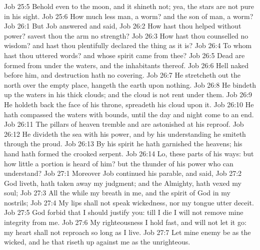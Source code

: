 \vs Job 25:5 Behold even to the moon, and it shineth not; yea, the stars are not pure in his sight.
\vs Job 25:6 How much less man,  a worm? and the son of man,  a worm?
\vs Job 26:1 But Job answered and said,
\vs Job 26:2 How hast thou helped  without power?  savest thou the arm  no strength?
\vs Job 26:3 How hast thou counselled  no wisdom? and  hast thou plentifully declared the thing as it is?
\vs Job 26:4 To whom hast thou uttered words? and whose spirit came from thee?
\vs Job 26:5 Dead  are formed from under the waters, and the inhabitants thereof.
\vs Job 26:6 Hell  naked before him, and destruction hath no covering.
\vs Job 26:7 He stretcheth out the north over the empty place,  hangeth the earth upon nothing.
\vs Job 26:8 He bindeth up the waters in his thick clouds; and the cloud is not rent under them.
\vs Job 26:9 He holdeth back the face of his throne,  spreadeth his cloud upon it.
\vs Job 26:10 He hath compassed the waters with bounds, until the day and night come to an end.
\vs Job 26:11 The pillars of heaven tremble and are astonished at his reproof.
\vs Job 26:12 He divideth the sea with his power, and by his understanding he smiteth through the proud.
\vs Job 26:13 By his spirit he hath garnished the heavens; his hand hath formed the crooked serpent.
\vs Job 26:14 Lo, these  parts of his ways: but how little a portion is heard of him? but the thunder of his power who can understand?
\vs Job 27:1 Moreover Job continued his parable, and said,
\vs Job 27:2  God liveth,  hath taken away my judgment; and the Almighty,  hath vexed my soul;
\vs Job 27:3 All the while my breath  in me, and the spirit of God  in my nostrils;
\vs Job 27:4 My lips shall not speak wickedness, nor my tongue utter deceit.
\vs Job 27:5 God forbid that I should justify you: till I die I will not remove mine integrity from me.
\vs Job 27:6 My righteousness I hold fast, and will not let it go: my heart shall not reproach  so long as I live.
\vs Job 27:7 Let mine enemy be as the wicked, and he that riseth up against me as the unrighteous.
